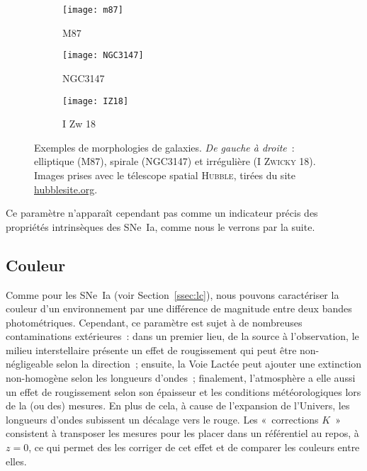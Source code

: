 \documentclass[../main/main.tex]{subfiles}
\begin{document}
\begin{figure}[t]
    \centering
    \begin{subfigure}[c]{.32\linewidth}
        \centering
        \texttt{[image: m87]}
        \captionsetup{justification=centering}
        \caption{M87}
        \label{fig:m87}
    \end{subfigure}
    \hfill
    \begin{subfigure}[c]{.32\linewidth}
        \centering
        \texttt{[image: NGC3147]}
        \captionsetup{justification=centering}
        \caption{NGC3147}
        \label{fig:ngc3147}
    \end{subfigure}
    \hfill
    \begin{subfigure}[c]{.32\linewidth}
        \centering
        \texttt{[image: IZ18]}
        \captionsetup{justification=centering}
        \caption{I Zw 18}
        \label{fig:iz18}
    \end{subfigure}
    \caption[Exemples de morphologies de galaxies]{Exemples de morphologies de
        galaxies. \textit{De gauche à droite}~: elliptique (M87), spirale
        (NGC3147) et irrégulière (I \textsc{Zwicky} 18). Images prises avec le
        télescope spatial \textsc{Hubble}, tirées
    du site \href{https://hubblesite.org}{hubblesite.org}.}
    \label{fig:gpict}
\end{figure}

Ce paramètre n'apparaît cependant pas comme un indicateur précis des propriétés
intrinsèques des SNe~Ia, comme nous le verrons par la suite.

\subsection{Couleur}\label{ssec:chost}

Comme pour les SNe~Ia (voir Section~\ref{ssec:lc}), nous pouvons caractériser la
couleur d'un environnement par une différence de magnitude entre deux bandes
photométriques. Cependant, ce paramètre est sujet à de nombreuses contaminations
extérieures~: dans un premier lieu, de la source à l'observation, le milieu
interstellaire présente un effet de rougissement qui peut être non-négligeable
selon la direction~; ensuite, la Voie Lactée peut ajouter une extinction
non-homogène selon les longueurs d'ondes~; finalement, l'atmosphère a elle aussi
un effet de rougissement selon son épaisseur et les conditions météorologiques
lors de la (ou des) mesures. En plus de cela, à cause de l'expansion de
l'Univers, les longueurs d'ondes subissent un décalage vers le rouge. Les
«~corrections $K$~» consistent à transposer les mesures pour les placer dans un
référentiel au repos, à $z=0$, ce qui permet des les corriger de cet effet et de
comparer les couleurs entre elles.
\end{document}
